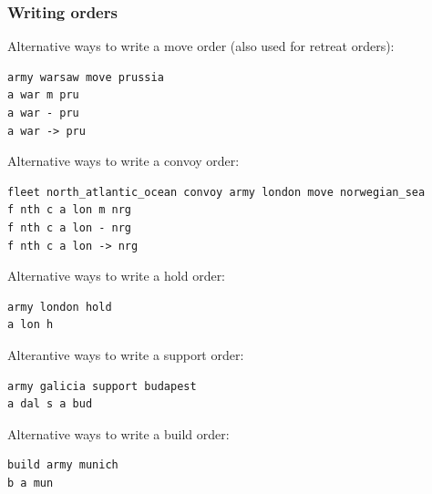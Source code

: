 \documentclass[11pt,a4paper]{report}
\begin{document}
\subsubsection*{Writing orders}
Alternative ways to write a move order (also used for retreat orders):
\begin{verbatim}
army warsaw move prussia
a war m pru
a war - pru
a war -> pru
\end{verbatim}
Alternative ways to write a convoy order:
\begin{verbatim}
fleet north_atlantic_ocean convoy army london move norwegian_sea
f nth c a lon m nrg
f nth c a lon - nrg
f nth c a lon -> nrg
\end{verbatim}
Alternative ways to write a hold order:
\begin{verbatim}
army london hold
a lon h
\end{verbatim}
Alterantive ways to write a support order:
\begin{verbatim}
army galicia support budapest
a dal s a bud
\end{verbatim}
Alternative ways to write a build order:
\begin{verbatim}
build army munich
b a mun
\end{verbatim}
\newpage
\end{document}
